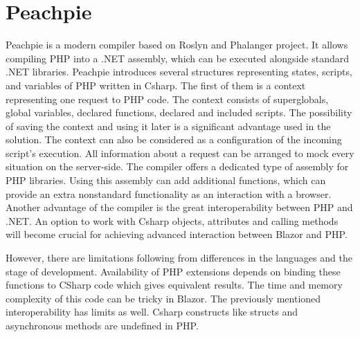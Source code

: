 
\section{Peachpie}

Peachpie  is a modern compiler based on Roslyn and Phalanger project.
It allows compiling PHP into a .NET assembly, which can be executed alongside standard .NET libraries.
Peachpie introduces several structures representing states, scripts, and variables of PHP written in Csharp.
The first of them is a context representing one request to PHP code.
The context consists of superglobals, global variables, declared functions, declared and included scripts.
The possibility of saving the context and using it later is a significant advantage used in the solution.
The context can also be considered as a configuration of the incoming script's execution.
All information about a request can be arranged to mock every situation on the server-side.
The compiler offers a dedicated type of assembly for PHP libraries.
Using this assembly can add additional functions, which can provide an extra nonstandard functionality as an interaction with a browser.
Another advantage of the compiler is the great interoperability between PHP and .NET.
An option to work with Csharp objects, attributes and calling methods will become crucial for achieving advanced interaction between Blazor and PHP.


However, there are limitations following from differences in the languages and the stage of development.
Availability of PHP extensions depends on binding these functions to CSharp code which gives equivalent results. The time and memory complexity of this code can be tricky in Blazor.
The previously mentioned interoperability has limits as well.
Csharp constructs like structs and asynchronous methods are undefined in PHP.


